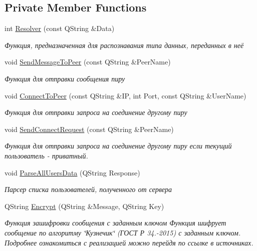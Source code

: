 \subsection*{Private Member Functions}
\begin{DoxyCompactItemize}
\item 
int \hyperlink{class_client_window_af38cd3b6f4d7e7ab2c805460a95d3172}{Resolver} (const Q\+String \&Data)
\begin{DoxyCompactList}\small\item\em Функция, предназначенная для распознавания типа данных, переданных в неё \end{DoxyCompactList}\item 
void \hyperlink{class_client_window_a1da98989dfae2558359e2bfe0a87f03d}{Send\+Message\+To\+Peer} (const Q\+String \&Peer\+Name)
\begin{DoxyCompactList}\small\item\em Функция для отправки сообщения пиру \end{DoxyCompactList}\item 
void \hyperlink{class_client_window_a6a95a02873ba28363e00cb27d7e9cc6c}{Connect\+To\+Peer} (const Q\+String \&IP, int Port, const Q\+String \&User\+Name)
\begin{DoxyCompactList}\small\item\em Функция для отправки запроса на соединение другому пиру \end{DoxyCompactList}\item 
void \hyperlink{class_client_window_a8c4913533d66f626237a353e98b81d69}{Send\+Connect\+Request} (const Q\+String \&Peer\+Name)
\begin{DoxyCompactList}\small\item\em Функция для отправки запроса на соединение другому пиру если текущий пользователь -\/ приватный. \end{DoxyCompactList}\item 
void \hyperlink{class_client_window_adef4d0491b4ac3d7f4066acfef0841c4}{Parse\+All\+Users\+Data} (Q\+String Response)
\begin{DoxyCompactList}\small\item\em Парсер списка пользователей, полученного от сервера \end{DoxyCompactList}\item 
Q\+String \hyperlink{class_client_window_a1d4012db90be784b11e1eda58202582c}{Encrypt} (Q\+String \&Message, Q\+String Key)
\begin{DoxyCompactList}\small\item\em Функция зашифровки сообщения с заданным ключом Функция шифрует сообщение по алгоритму \char`\"{}Кузнечик\char`\"{} (ГОСТ Р 34.-\/2015) с заданным ключом. Подробнее ознакомиться с реализацией можно перейдя по ссылке в источниках. \end{DoxyCompactList}\item 

\end{DoxyCompactItemize}
